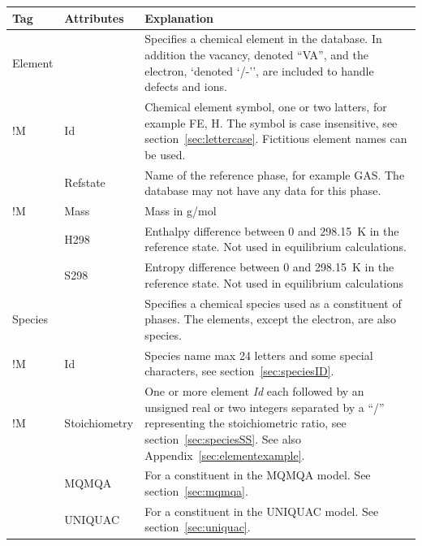 \documentclass{article}
\begin{document}
\begin{tabular}{|p{} p{} p{}|}\hline
  Tag & Attributes & Explanation\\\hline

  Element & & Specifies a chemical element in the database.  In addition
              the vacancy, denoted ``VA'', and the electron, `denoted `/-'',
              are included to handle defects and ions.\\
!M        & Id   &  Chemical element symbol, one or two latters, 
                    for example FE, H.  The symbol is case insensitive,
                    see section~\ref{sec:lettercase}.
                    Fictitious element names can be used. \\
          & Refstate  &  Name of the reference  phase, for example GAS.  The
                         database may not have any data for this phase. \\
!M        & Mass   &  Mass in g/mol\\
          & H298   &  Enthalpy difference between 0 and 298.15~K 
                      in the reference state.  Not used in equilibrium
                      calculations. \\
          & S298    &  Entropy difference between 0 and 298.15~K in 
                       the reference state.  Not used in equilibrium
                       calculations\\\hline

  Species & & Specifies a chemical species used as a constituent of phases.  
                        The elements, except the electron, are also species.\\
!M        & Id        & Species name max 24 letters and some special
                         characters, see section~\ref{sec:speciesID}.\\
!M        & Stoichiometry & One or more element {\em Id} each followed by 
                        an unsigned real or two integers separated by a ``/'' 
                        representing the stoichiometric ratio,
                        see section~\ref{sec:speciesSS}.  See also
                        Appendix~\ref{sec:elementexample}.\\
          & MQMQA     & For a constituent in the MQMQA model.  See 
                        section~\ref{sec:mqmqa}.\\
          & UNIQUAC   & For a constituent in the UNIQUAC model. See 
                        section~\ref{sec:uniquac}.\\\hline

\end{tabular}
\end{document}

